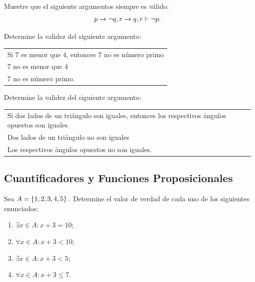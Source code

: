 \begin{exmp}
  Muestre que el siguiente argumentos siempre es v\'alido:
 $$
 p \rightarrow \neg q, r \rightarrow q, r \vdash \neg p.
 $$
\end{exmp}




 \begin{exmp}
  Determine la validez del siguiente argumento:
  \begin{center}
\begin{tabular}{l}
Si $7$ es menor que $4$, entonces $7$ no es n\'umero primo\\
$7$ no es menor que $4$\\\hline
$7$ no es n\'umero primo.
  \end{tabular}
  \end{center}

 \end{exmp}




 \begin{exmp}
  Determine la validez del siguiente argumento:
  \begin{center}
\begin{tabular}{l}
Si dos lados de un tri\'angulo son iguales, entonces los respectivos \'angulos opuestos son iguales\\
Dos lados de un tri\'angulo no son iguales\\\hline
Los respectivos \'angulos opuestos no son iguales.
  \end{tabular}
  \end{center}

 \end{exmp}



\subsection{Cuantificadores y Funciones Proposicionales}


 \begin{exmp}
  Sea $A=\left\{ 1,2,3,4,5 \right\}.$ Determine el valor de verdad de cada uno de los siguientes enunciados:
  \begin{enumerate}
   \item $\exists x \in A: x+3=10;$ 
   \item $\forall x \in A: x+3<10;$ 
   \item $\exists x \in A: x+3<5;$ 
   \item $\forall x \in A: x+3 \leq 7.$
  \end{enumerate}

 \end{exmp}




